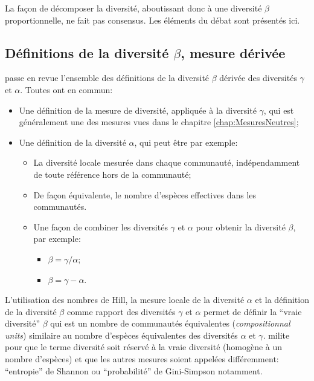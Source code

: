 \documentclass[
  11pt,
  french,
  a4paper,
  extrafontsizes,onecolumn,openright
  ]{memoir}
\providecommand{\tightlist}{%
  \setlength{\itemsep}{0pt}\setlength{\parskip}{0pt}}
\begin{document}
La façon de décomposer la diversité, aboutissant donc à une diversité \(\beta\) proportionnelle, ne fait pas consensus.
Les éléments du débat sont présentés ici.

\hypertarget{duxe9finitions-de-la-diversituxe9-beta-mesure-duxe9rivuxe9e}{%
\subsection{\texorpdfstring{Définitions de la diversité \(\beta\), mesure dérivée}{Définitions de la diversité \textbackslash beta, mesure dérivée}}\label{duxe9finitions-de-la-diversituxe9-beta-mesure-duxe9rivuxe9e}}

\textcite{Tuomisto2010a} passe en revue l'ensemble des définitions de la diversité \(\beta\) dérivée des diversités \(\gamma\) et \(\alpha\).
Toutes ont en commun:

\begin{itemize}
\tightlist
\item
  Une définition de la mesure de diversité, appliquée à la diversité \(\gamma\), qui est généralement une des mesures vues dans le chapitre \ref{chap:MesuresNeutres};
\item
  Une définition de la diversité \(\alpha\), qui peut être par exemple:

  \begin{itemize}
  \tightlist
  \item
    La diversité locale mesurée dans chaque communauté, indépendamment de toute référence hors de la communauté;
  \item
    De façon équivalente, le nombre d'espèces effectives dans les communautés.
  \item
    Une façon de combiner les diversités \(\gamma\) et \(\alpha\) pour obtenir la diversité \(\beta\), par exemple:

    \begin{itemize}
    \tightlist
    \item
      \(\beta={\gamma}/{\alpha}\);
    \item
      \(\beta=\gamma-\alpha\).
    \end{itemize}
  \end{itemize}
\end{itemize}

L'utilisation des nombres de Hill, la mesure locale de la diversité \(\alpha\) et la définition de la diversité \(\beta\) comme rapport des diversités \(\gamma\) et \(\alpha\) permet de définir la \enquote{vraie diversité} \autocite{Jost2006,Jost2007} \(\beta\) qui est un nombre de communautés équivalentes (\emph{compositionnal units}) similaire au nombre d'espèces équivalentes des diversités \(\alpha\) et \(\gamma\).
\textcite{Tuomisto2011} milite pour que le terme diversité soit réservé à la vraie diversité (homogène à un nombre d'espèces) et que les autres mesures soient appelées différemment: \enquote{entropie} de Shannon ou \enquote{probabilité} de Gini-Simpson notamment.
\end{document}
